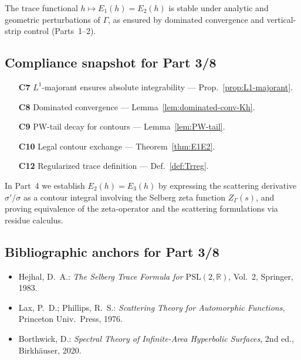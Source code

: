\begin{invariant}
The trace functional $h\mapsto E_1(h)=E_2(h)$ is stable under analytic and geometric perturbations of $\Gamma$, as ensured by dominated convergence and vertical-strip control (Parts~1–2). \relax
\end{invariant}

\subsection{Compliance snapshot for Part 3/8}
\label{subsec:ch4-part3-compliance} \relax

\begin{itemize}
  \item[\textbf{C7}] $L^1$-majorant ensures absolute integrability — Prop.~\ref{prop:L1-majorant}. %
  \item[\textbf{C8}] Dominated convergence — Lemma~\ref{lem:dominated-conv-Kh}. %
  \item[\textbf{C9}] PW-tail decay for contours — Lemma~\ref{lem:PW-tail}. %
  \item[\textbf{C10}] Legal contour exchange — Theorem~\ref{thm:E1E2}. %
  \item[\textbf{C12}] Regularized trace definition — Def.~\ref{def:Trreg}. %
\end{itemize}

\begin{remark}
\label{rem:forward-part4}
In Part~4 we establish $E_2(h)=E_3(h)$ by expressing the scattering derivative $\sigma'/\sigma$ as a contour integral involving the Selberg zeta function $Z_\Gamma(s)$, and proving equivalence of the zeta-operator and the scattering formulations via residue calculus. \relax
\end{remark}

\subsection{Bibliographic anchors for Part 3/8}
\label{subsec:ch4-part3-bib-anchors} \relax

\begin{itemize}
  \item Hejhal, D.~A.: \emph{The Selberg Trace Formula for $\mathrm{PSL}(2,\mathbb{R})$}, Vol.~2, Springer, 1983. %
  \item Lax, P.~D.; Phillips, R.~S.: \emph{Scattering Theory for Automorphic Functions}, Princeton Univ.\ Press, 1976. %
  \item Borthwick, D.: \emph{Spectral Theory of Infinite-Area Hyperbolic Surfaces}, 2nd ed., Birkhäuser, 2020. %
\end{itemize}

